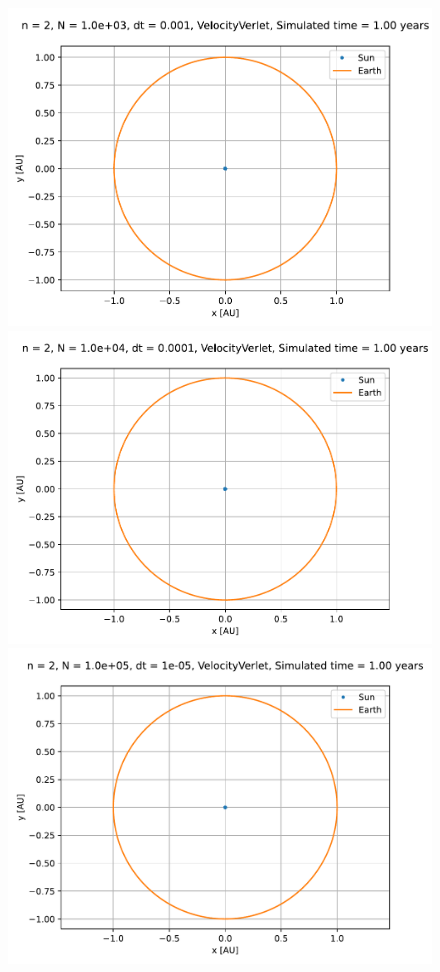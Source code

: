 \documentclass[reprint,english,notitlepage]{revtex4-1}  %
\begin{document}
\begin{figure}[H]
\includegraphics[width=\columnwidth]{../data/figures/sun-earth-3c/se_dt1e-3_vv_orbit2D.pdf}
\includegraphics[width=\columnwidth]{../data/figures/sun-earth-3c/se_dt1e-4_vv_orbit2D.pdf}
\includegraphics[width=\columnwidth]{../data/figures/sun-earth-3c/se_dt1e-5_vv_orbit2D.pdf}

\end{figure}
\end{document}
